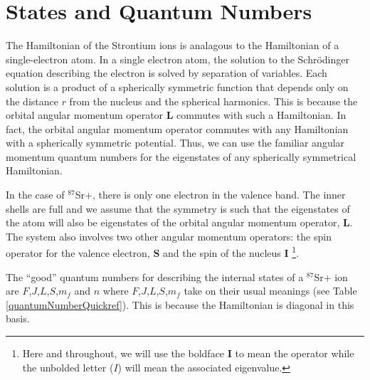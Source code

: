 
\section{States and Quantum Numbers}

The Hamiltonian of the Strontium ions is analagous to the Hamiltonian of a single-electron atom. 
In a single electron atom, the solution to the Schr\"odinger equation describing the electron is solved by separation of variables.
 Each solution is a product of a spherically symmetric function that depends only on the distance $r$ from the nucleus and the spherical harmonics.
This is because the orbital angular momentum operator $\mathbf{L}$ commutes with such a Hamiltonian. In fact, the orbital angular momentum operator commutes with any Hamiltonian with a spherically symmetric potential.
Thus, we can use the familiar angular momentum quantum numbers for the eigenstates of any spherically symmetrical Hamiltonian.

In the case of $^{87}$Sr+, there is only one electron in the valence band. The inner shells are full and we assume that the symmetry is such that the eigenstates of the atom will also be eigenstates of the orbital angular momentum operator, $\mathbf{L}$.
 The system also involves two other angular momentum operators: the spin operator for the valence electron, $\mathbf{S}$%
and the spin of the nucleus $\mathbf{I}$ \footnote{Here and throughout, we will use the boldface $\mathbf{I}$ to mean the operator while the unbolded letter ($I$) will mean the associated eigenvalue.}.

The ``good'' quantum numbers for describing the internal states of a $^{87}$Sr+ ion are $F$,$J$,$L$,$S$,$m_f$ and $n$\cite{experimental_hyperfine_alkali_arimondo}\cite{cuaMITnotes} where $F$,$J$,$L$,$S$,$m_f$ take on their usual meanings (see Table\,\ref{quantumNumberQuickref}). This is because the Hamiltonian is diagonal in this basis.

